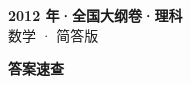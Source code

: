 \documentclass[zihao=-4, a4paper]{ctexart}
\begin{document}
\begin{center}
  {\Large\bfseries 2012 年·全国大纲卷·理科}\\[4pt]
  {\large 数学 · 简答版}
\end{center}
\medskip
{}

\clearpage
{}
\begin{center}{\Large\bfseries 答案速查}\end{center}
\medskip

\end{document}
